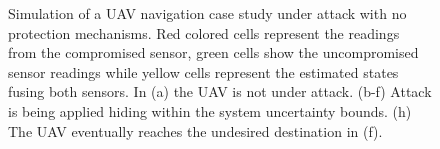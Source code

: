 \documentclass[letterpaper, 10 pt, conference]{ieeeconf}  %
\begin{document}
\begin{figure}[]
	\centering
	\vspace{-5pt}
	\caption{Simulation of a UAV navigation case study under attack with no protection mechanisms. Red colored cells represent the readings from the compromised sensor, green cells show the uncompromised sensor readings while yellow cells represent the estimated states fusing both sensors. In (a) the UAV is not under attack. (b-f) Attack is being applied hiding within the system uncertainty bounds. (h) The UAV eventually reaches the undesired destination in (f).}
	\label{fig:successful-attack}
\end{figure}
\end{document}
